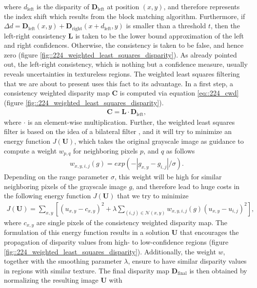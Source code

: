 where $d_\text{left}$ is the disparity of $\bm{D}_\text{left}$ at position $(x,y)$, and therefore represents the index shift which results from the block matching algorithm. Furthermore, if $\Delta d = \bm{D}_\text{left}(x, y) + \bm{D}_\text{right}(x + d_\text{left}, y)$ is smaller than a threshold $t$, then the left-right consistency $\bm{L}$ is taken to be the lower bound approximation of the left and right confidences. Otherwise, the consistency is taken to be false, and hence zero (figure \ref{fig::224_weighted_least_squares_disparity}). As already pointed out, the left-right consistency, which is nothing but a confidence measure, usually reveals uncertainties in textureless regions. The weighted least squares filtering that we are about to present uses this fact to its advantage. In a first step, a consistency weighted disparity map $\bm{C}$ is computed via equation \ref{eq::224_cwd} (figure \ref{fig::224_weighted_least_squares_disparity}).
\begin{align}
	\bm{C}=\bm{L}\cdot\bm{D}_\text{left},
	\label{eq::224_cwd}
\end{align}
where $\cdot$ is an element-wise multiplication. Further, the weighted least squares filter is based on the idea of a bilateral filter \cite{tomasi1998bilateral}, and it will try to minimize an energy function $J(\bm{U})$, which takes the original grayscale image as guidance to compute a weight $w_{p,q}$ for neighboring pixels $p$, and $q$ as follows
\begin{align}
	w_{x,y,i,j}(g) = exp(-|g_{x,y}-g_{i,j}|/\sigma).
	\label{eq::224_weight}
\end{align}
Depending on the range parameter $\sigma$, this weight will be high for similar neighboring pixels of the grayscale image $g$, and therefore lead to huge costs in the following energy function $J(\bm{U})$ that we try to minimize
\begin{align}
	J(\bm{U}) = \sum_{x,y}\left[(u_{x,y}-c_{x,y})^2+\lambda\sum_{(i,j)\in\mathcal{N}(x,y)}w_{x,y,i,j}(g)(u_{x,y}-u_{i,j})^2\right],
	\label{eq::224_energy_function}
\end{align}
where $c_{x,y}$ are single pixels of the consistency weighted disparity map. The formulation of this energy function results in a solution $\bm{U}$ that encourages the propagation of disparity values from high- to low-confidence regions (figure \ref{fig::224_weighted_least_squares_disparity}). Additionally, the weight $w$, together with the smoothing parameter $\lambda$, ensure to have similar disparity values in regions with similar texture. The final disparity map $\bm{D}_\text{final}$ is then obtained by normalizing the resulting image $\bm{U}$ with
